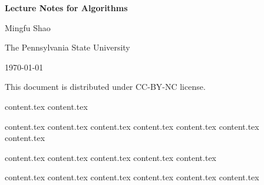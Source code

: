 \documentclass[letterpaper,11pt]{article}
\theoremstyle{mytheorem}
\begin{document}

\thispagestyle{titlestyle}
\begin{center}
\vspace*{4cm} {\Huge \bf Lecture Notes for Algorithms } \vspace*{2cm}

{\Large  Mingfu Shao}

{\Large  The Pennsylvania State University}

{\Large  \today}

\vspace*{8cm}

{\large This document is distributed under CC-BY-NC license.}
\end{center}

\clearpage \newpage


\makeatletter
\renewcommand{\l@section}{\@dottedtocline{1}{0em}{5em}}
\makeatother

\thispagestyle{tablestyle}
\tableofcontents \thispagestyle{tablestyle} \clearpage \newpage

{content.tex} \clearpage\newpage
{content.tex} \clearpage\newpage

{content.tex} \clearpage\newpage
{content.tex} \clearpage\newpage
{content.tex} \clearpage\newpage
{content.tex} \clearpage\newpage
{content.tex} \clearpage\newpage
{content.tex} \clearpage\newpage
{content.tex} \clearpage\newpage

{content.tex} \clearpage\newpage
{content.tex} \clearpage\newpage
{content.tex} \clearpage\newpage
{content.tex} \clearpage\newpage
{content.tex} \clearpage\newpage

{content.tex} \clearpage\newpage
{content.tex} \clearpage\newpage
{content.tex} \clearpage\newpage
{content.tex} \clearpage\newpage
{content.tex} \clearpage\newpage
{content.tex} \clearpage\newpage
\end{document}
